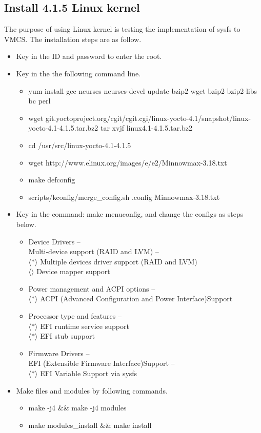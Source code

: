 \documentclass[10pt,draftclsnofoot,journal,compsoc,onecolumn]{IEEEtran}
\begin{document}
\subsection{Install 4.1.5 Linux kernel}
	The purpose of using Linux kernel is testing the implementation of sysfs to VMCS. The installation steps are as follow.
\begin{itemize}    
\item Key in the ID and password to enter the root. 
\item Key in the the following command line.
\begin{itemize} 
\item yum install gcc ncurses ncurses-devel update bzip2 wget bzip2 bzip2-libs bc perl
\item wget git.yoctoproject.org/cgit/cgit.cgi/linux-yocto-4.1/snapshot/linux-yocto-4.1-4.1.5.tar.bz2
tar xvjf linux4.1-4.1.5.tar.bz2
\item cd /usr/src/linux-yocto-4.1-4.1.5 
\item wget http://www.elinux.org/images/e/e2/Minnowmax-3.18.txt
\item make defconfig
\item scripts/kconfig/merge\_config.sh .config Minnowmax-3.18.txt
\end{itemize}
\item Key in the command: make menuconfig, and change the configs as steps below.
\begin{itemize} 
\item Device Drivers -- \\
		Multi-device support (RAID and LVM) -- \\
        $\langle * \rangle$ Multiple devices driver support (RAID and LVM)\\
        $\langle  \rangle$ Device mapper support
\item Power management and ACPI options -- \\
		$\langle * \rangle$ ACPI (Advanced Configuration and Power Interface)Support
\item Processor type and features -- \\
		$\langle * \rangle$ EFI runtime service support \\
        $\langle * \rangle$ EFI stub support
\item Firmware Drivers -- \\
		EFI (Extensible Firmware Interface)Support -- \\
        $\langle * \rangle$ EFI Variable Support via sysfs
\end{itemize}
\item Make files and modules by following commands.
\begin{itemize} 
\item make -j4 \&\& make -j4 modules
\item make modules\_install \&\& make install
\end{itemize}
\end{itemize}
\end{document}
